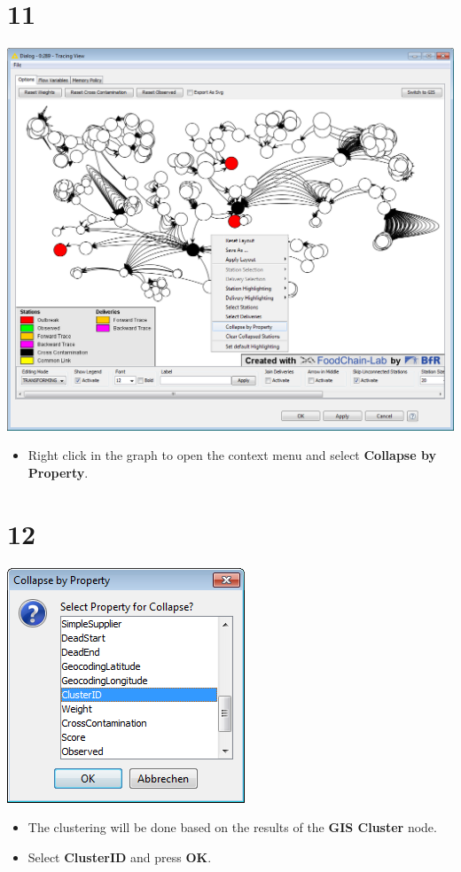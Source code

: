 \documentclass{beamer}
\begin{document}
\section{11}
\begin{frame}
	\begin{center}
  		\includegraphics[height=0.6\textheight]{11.png}
	\end{center}
	\begin{itemize}
		\item Right click in the graph to open the context menu and select \textbf{Collapse by Property}.
	\end{itemize}
\end{frame}

\section{12}
\begin{frame}
	\begin{center}
  		\includegraphics[height=0.5\textheight]{12.png}
	\end{center}
	\begin{itemize}
		\item The clustering will be done based on the results of the \textbf{GIS Cluster} node.
		\item Select \textbf{ClusterID} and press \textbf{OK}.
	\end{itemize}
\end{frame}
\end{document}
